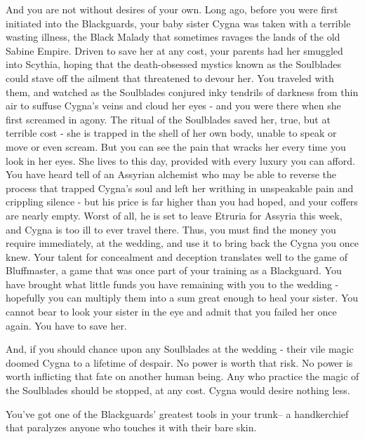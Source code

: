 \documentclass[char]{Kos}
\begin{document}
    And you are not without desires of your own. Long ago, before you were first initiated into the Blackguards, your baby sister Cygna was taken with a terrible wasting illness, the Black Malady that sometimes ravages the lands of the old Sabine Empire. Driven to save her at any cost, your parents had her smuggled into Scythia, hoping that the death-obsessed mystics known as the Soulblades could stave off the ailment that threatened to devour her. You traveled with them, and watched as the Soulblades conjured inky tendrils of darkness from thin air to suffuse Cygna's veins and cloud her eyes - and you were there when she first screamed in agony. The ritual of the Soulblades saved her, true, but at terrible cost - she is trapped in the shell of her own body, unable to speak or move or even scream. But you can see the pain that wracks her every time you look in her eyes. She lives to this day, provided with every luxury you can afford. You have heard tell of an Assyrian alchemist who may be able to reverse the process that trapped Cygna's soul and left her writhing in unspeakable pain and crippling silence - but his price is far higher than you had hoped, and your coffers are nearly empty. Worst of all, he is set to leave Etruria for Assyria this week, and Cygna is too ill to ever travel there. Thus, you must find the money you require immediately, at the wedding, and use it to bring back the Cygna you once knew. Your talent for concealment and deception translates well to the game of Bluffmaster, a game that was once part of your training as a Blackguard. You have brought what little funds you have remaining with you to the wedding - hopefully you can multiply them into a sum great enough to heal your sister. You cannot bear to look your sister in the eye and admit that you failed her once again. You have to save her.

    And, if you should chance upon any Soulblades at the wedding - their vile magic doomed Cygna to a lifetime of despair. No power is worth that risk. No power is worth inflicting that fate on another human being. Any who practice the magic of the Soulblades should be stopped, at any cost. Cygna would desire nothing less.
    
\begin{itemz}[Notes]
  \item You've got one of the Blackguards' greatest tools in your trunk-- a handkerchief that paralyzes anyone who touches it with their bare skin.
  \end{itemz}
\end{document}
